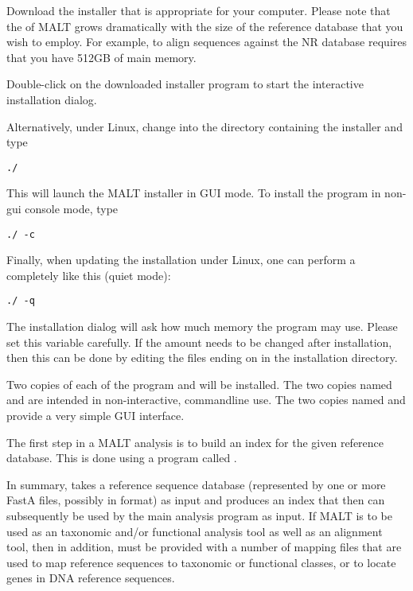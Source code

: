 \documentclass[11pt]{article}
\newcommand\MALT{{\sf MALT}\xspace}
\begin{document}
Download the installer that is appropriate for your computer. Please note that the 
of \MALT grows dramatically with the size of the reference database that you wish to employ.
For example, to align sequences against the NR database requires that you have 512GB of main memory.

Double-click on the downloaded installer program  to start the interactive installation dialog.

Alternatively, under Linux, change into the directory containing the installer and type

{\tt ./}

This will launch the \MALT installer in GUI mode. To install the program in non-gui console mode,
type

{\tt ./ -c}

Finally, when updating the installation under Linux, one can perform a completely
 like this (quiet mode):

{\tt ./ -q}

The installation dialog will ask how much memory the program may use. Please set this variable carefully.
If the amount needs to be changed after installation, then this can be done by editing the files
ending on  in the installation directory.

Two copies of each of the program  and  will be installed.
The two copies named  and  are intended in non-interactive, commandline use.
The two copies  named  and  provide a very simple GUI interface.





The first step in a \MALT analysis is to build an index for the given reference database. This is done
using  a program called .

In summary,  takes a reference sequence database (represented by
one or more FastA files, possibly in  format) as input and produces an index that then can  subsequently be used
by the main analysis program  as input.
If \MALT is to be used as an taxonomic and/or functional analysis tool as well as an alignment tool, then
in addition,   must be provided with a number of mapping files that are used
to map reference sequences to taxonomic or functional classes{, or to locate genes in DNA reference sequences}.
\end{document}
